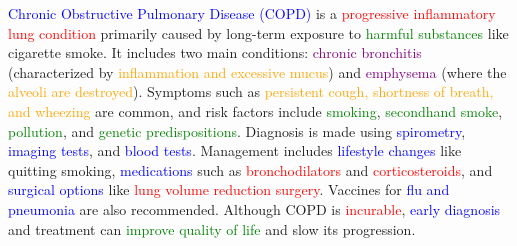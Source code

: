 \textcolor{blue}{Chronic Obstructive Pulmonary Disease (COPD)} is a \textcolor{red}{progressive inflammatory lung condition} primarily caused by long-term exposure to \textcolor{green}{harmful substances} like cigarette smoke. It includes two main conditions: \textcolor{purple}{chronic bronchitis} (characterized by \textcolor{orange}{inflammation and excessive mucus}) and \textcolor{purple}{emphysema} (where the \textcolor{orange}{alveoli are destroyed}). Symptoms such as \textcolor{orange}{persistent cough, shortness of breath, and wheezing} are common, and risk factors include \textcolor{green}{smoking}, \textcolor{green}{secondhand smoke}, \textcolor{green}{pollution}, and \textcolor{green}{genetic predispositions}. Diagnosis is made using \textcolor{blue}{spirometry}, \textcolor{blue}{imaging tests}, and \textcolor{blue}{blood tests}. Management includes \textcolor{blue}{lifestyle changes} like quitting smoking, \textcolor{blue}{medications} such as \textcolor{red}{bronchodilators} and \textcolor{red}{corticosteroids}, and \textcolor{blue}{surgical options} like \textcolor{red}{lung volume reduction surgery}. Vaccines for \textcolor{blue}{flu and pneumonia} are also recommended. Although COPD is \textcolor{red}{incurable}, \textcolor{blue}{early diagnosis} and treatment can \textcolor{green}{improve quality of life} and slow its progression.



